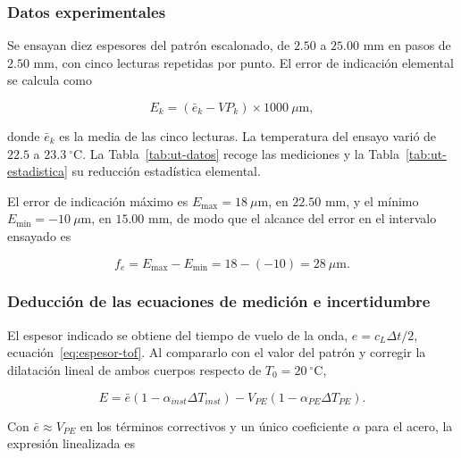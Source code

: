 \subsubsection{Datos experimentales}
\label{sec:ut-datos}

Se ensayan diez espesores del patrón escalonado, de $2.50$ a $25.00$ mm en pasos de
$2.50$ mm, con cinco lecturas repetidas por punto. El error de indicación elemental
se calcula como

\begin{equation}
    E_k = \left(\bar e_k - VP_k\right)\times 1000\ \mu\text{m},
    \label{eq:ut-E-simple}
\end{equation}

donde $\bar e_k$ es la media de las cinco lecturas. La temperatura del ensayo varió
de $22.5$ a $23.3\ ^\circ\text{C}$. La Tabla~\ref{tab:ut-datos} recoge las
mediciones y la Tabla~\ref{tab:ut-estadistica} su reducción estadística elemental.





El error de indicación máximo es $E_{\max} = 18\ \mu\text{m}$, en $22.50$ mm, y el
mínimo $E_{\min} = -10\ \mu\text{m}$, en $15.00$ mm, de modo que el alcance del
error en el intervalo ensayado es

\begin{equation}
    f_e = E_{\max} - E_{\min} = 18 - (-10) = 28\ \mu\text{m}.
    \label{eq:ut-fe}
\end{equation}

\subsubsection{Deducción de las ecuaciones de medición e incertidumbre}

El espesor indicado se obtiene del tiempo de vuelo de la onda,
$e = c_L \Delta t / 2$, ecuación~\eqref{eq:espesor-tof}. Al compararlo con el valor
del patrón y corregir la dilatación lineal de ambos cuerpos respecto de
$T_0 = 20\ ^\circ\text{C}$,

\begin{equation}
  E = \bar e\left(1 - \alpha_{inst} \Delta T_{inst}\right)
    - V_{PE}\left(1 - \alpha_{PE} \Delta T_{PE}\right).
  \label{eq:ut-e-termal}
\end{equation}

Con $\bar e \approx V_{PE}$ en los términos correctivos y un único coeficiente
$\alpha$ para el acero, la expresión linealizada es

